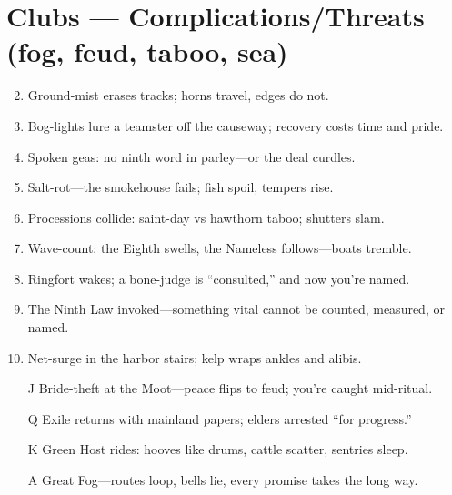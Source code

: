 \section*{Clubs --- Complications/Threats (fog, feud, taboo, sea)}
\begin{enumerate}
\setcounter{enumi}{1}
\item Ground-mist erases tracks; horns travel, edges do not.
\item Bog-lights lure a teamster off the causeway; recovery costs time and pride.
\item Spoken geas: no ninth word in parley---or the deal curdles.
\item Salt-rot---the smokehouse fails; fish spoil, tempers rise.
\item Processions collide: saint-day vs hawthorn taboo; shutters slam.
\item Wave-count: the Eighth swells, the Nameless follows---boats tremble.
\item Ringfort wakes; a bone-judge is ``consulted,'' and now you're named.
\item The Ninth Law invoked---something vital cannot be counted, measured, or named.
\item Net-surge in the harbor stairs; kelp wraps ankles and alibis.
\item[J] Bride-theft at the Moot---peace flips to feud; you're caught mid-ritual.
\item[Q] Exile returns with mainland papers; elders arrested ``for progress.''
\item[K] Green Host rides: hooves like drums, cattle scatter, sentries sleep.
\item[A] Great Fog---routes loop, bells lie, every promise takes the long way.
\end{enumerate}

